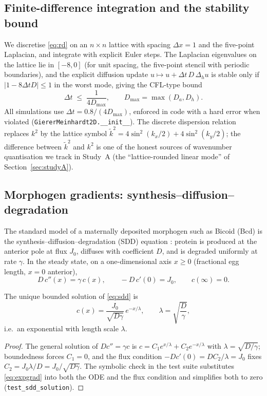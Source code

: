\subsection{Finite-difference integration and the stability bound}
\label{sec:math-cfl}

We discretise \eqref{eq:rd} on an $n \times n$ lattice with spacing
$\Delta x = 1$ and the five-point Laplacian, and integrate with explicit Euler
steps. The Laplacian eigenvalues on the lattice lie in $[-8, 0]$ (for
unit spacing, the five-point stencil with periodic boundaries), and the
explicit diffusion update $u \mapsto u + \Delta t\, D\, \Delta_h u$ is stable
only if $|1 - 8 \Delta t D| \le 1$ in the worst mode, giving the CFL-type
bound
\begin{equation}
\Delta t \;\le\; \frac{1}{4 D_{\max}}, \qquad D_{\max} = \max(D_a, D_h).
\label{eq:cfl}
\end{equation}
All simulations use $\Delta t = 0.8 / (4 D_{\max})$, enforced in code with a
hard error when violated (\texttt{GiererMeinhardt2D.\_\_init\_\_}). The
discrete dispersion relation replaces $k^2$ by the lattice symbol
$\tilde k^2 = 4\sin^2(k_x/2) + 4\sin^2(k_y/2)$; the difference between
$\tilde k^2$ and $k^2$ is one of the honest sources of wavenumber quantisation
we track in Study~A (the ``lattice-rounded linear mode'' of
Section~\ref{sec:studyA}).

\subsection{Morphogen gradients: synthesis--diffusion--degradation}
\label{sec:math-sdd}

The standard model of a maternally deposited morphogen such as Bicoid (Bcd) is
the synthesis--diffusion--degradation (SDD) equation \cite{gregor2007}: protein
is produced at the anterior pole at flux $J_0$, diffuses with coefficient $D$,
and is degraded uniformly at rate $\gamma$. In the steady state, on a
one-dimensional axis $x \ge 0$ (fractional egg length, $x=0$ anterior),
\begin{equation}
D\, c''(x) = \gamma\, c(x), \qquad -D\, c'(0) = J_0, \qquad c(\infty) = 0.
\label{eq:sdd}
\end{equation}

\begin{proposition}
The unique bounded solution of \eqref{eq:sdd} is
\begin{equation}
c(x) = \frac{J_0}{\sqrt{D\gamma}}\, e^{-x/\lambda},
\qquad \lambda = \sqrt{\frac{D}{\gamma}} ,
\label{eq:expgrad}
\end{equation}
i.e.\ an exponential with length scale $\lambda$.
\end{proposition}
\begin{proof}
The general solution of $D c'' = \gamma c$ is $c = C_1 e^{x/\lambda} +
C_2 e^{-x/\lambda}$ with $\lambda = \sqrt{D/\gamma}$; boundedness forces
$C_1 = 0$, and the flux condition $-D c'(0) = D C_2/\lambda = J_0$ fixes
$C_2 = J_0\lambda/D = J_0/\sqrt{D\gamma}$. The symbolic check in the test
suite substitutes \eqref{eq:expgrad} into both the ODE and the flux condition
and simplifies both to zero (\texttt{test\_sdd\_solution}).
\end{proof}

